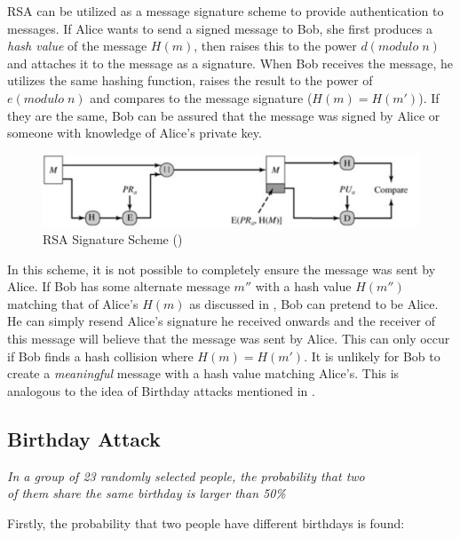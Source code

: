 \documentclass[]{article}
\begin{document}
RSA can be utilized as a message signature scheme to provide authentication to messages. If Alice wants to send a signed message to Bob, she first produces a \textit{hash value} of the message $H(m)$, then raises this to the power $d(modulo\;n)$ and attaches it to the message as a signature. When Bob receives the message, he utilizes the same hashing function, raises the result to the power of $e(modulo\;n)$ and compares to the message signature ($H(m)=H(m')$). If they are the same, Bob can be assured that the message was signed by Alice or someone with knowledge of Alice's private key.\\

\begin{figure}[H]
	\centering
	\includegraphics[height=\textheight/7,width=12cm]{rsasignature.png}
	\caption{RSA Signature Scheme (\cite{alttext})}
\end{figure}

\noindent
In this scheme, it is not possible to completely ensure the message was sent by Alice. If Bob has some alternate message $m''$ with a hash value $H(m'')$ matching that of Alice's $H(m)$ as discussed in \cite{RSA}, Bob can pretend to be Alice. He can simply resend Alice's signature he received onwards and the receiver of this message will believe that the message was sent by Alice. This can only occur if Bob finds a hash collision where $H(m)=H(m')$. It is unlikely for Bob to create a \textit{meaningful} message with a hash value matching Alice's. This is analogous to the idea of Birthday attacks mentioned in \cite{lecture3}.

\subsection*{Birthday Attack}

\vspace{0.5cm}
\begin{center}
\textit{In a group of 23 randomly selected people, the probability that two\\ of them share the same birthday is larger than 50\%}
\end{center}
\vspace{0.5cm}

\noindent
Firstly, the probability that two people have different birthdays is found:
\end{document}
